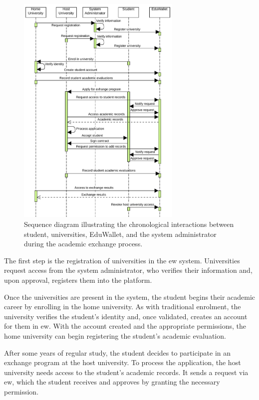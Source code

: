 \begin{figure}
  \centering
  \includegraphics[width=0.7\textwidth]{figures/Sequence diagram.pdf}
  \caption[Sequence diagram of the EduWallet use case]{Sequence diagram illustrating the chronological interactions between student, universities, EduWallet, and the system administrator during the academic exchange process.}
  \label{fig:sequenceDiagram}
\end{figure}

The first step is the registration of universities in the \gls{ew} system. Universities request access from the system administrator, who verifies their information and, upon approval, registers them into the platform.

Once the universities are present in the system, the student begins their academic career by enrolling in the home university. As with traditional enrolment, the university verifies the student's identity and, once validated, creates an account for them in \gls{ew}. With the account created and the appropriate permissions, the home university can begin registering the student's academic evaluation.

After some years of regular study, the student decides to participate in an exchange program at the host university. To process the application, the host university needs access to the student's academic records. It sends a request via \gls{ew}, which the student receives and approves by granting the necessary permission.

